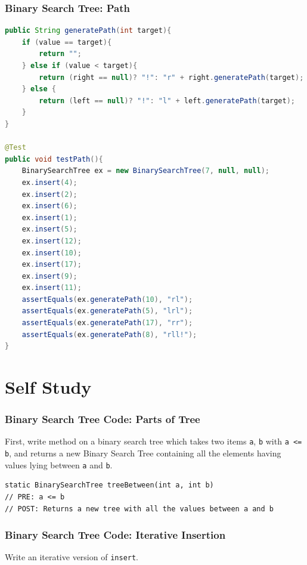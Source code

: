 \documentclass[twoside=false,DIV=14]{scrartcl}
\begin{document}
\section{Binary Search Tree: Path}
\begin{lstlisting}[language=java]
public String generatePath(int target){
    if (value == target){
        return "";
    } else if (value < target){
        return (right == null)? "!": "r" + right.generatePath(target);
    } else {
        return (left == null)? "!": "l" + left.generatePath(target);
    }
}

@Test
public void testPath(){
    BinarySearchTree ex = new BinarySearchTree(7, null, null);
    ex.insert(4);
    ex.insert(2);
    ex.insert(6);
    ex.insert(1);
    ex.insert(5);
    ex.insert(12);
    ex.insert(10);
    ex.insert(17);
    ex.insert(9);
    ex.insert(11);
    assertEquals(ex.generatePath(10), "rl");
    assertEquals(ex.generatePath(5), "lrl");
    assertEquals(ex.generatePath(17), "rr");
    assertEquals(ex.generatePath(8), "rll!");
}

\end{lstlisting}
\newpage\setcounter{section}{0}
\part*{Self Study}

\section{Binary Search Tree Code: Parts of Tree}
First, write method on a binary search tree which takes two items \verb+a+, \verb+b+
with \verb+a <= b+, and returns a new Binary Search Tree containing all the elements having values lying between \verb+a+ and \verb+b+.
\begin{lstlisting}
static BinarySearchTree treeBetween(int a, int b)
// PRE: a <= b
// POST: Returns a new tree with all the values between a and b
\end{lstlisting}

\section{Binary Search Tree Code: Iterative Insertion}
Write an iterative version of \verb+insert+.
\end{document}
